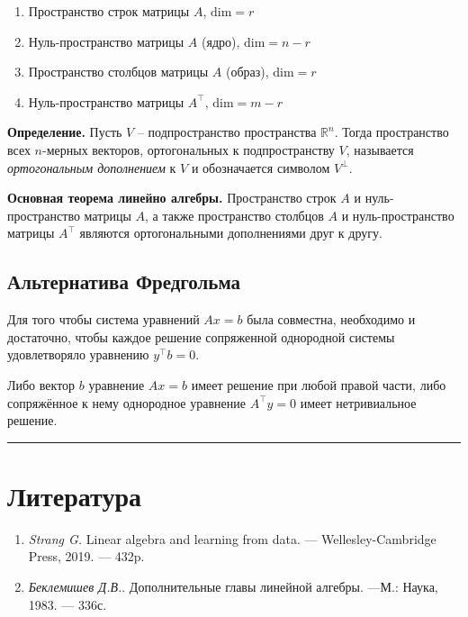 \documentclass[11pt,a4paper]{article}
\renewcommand{\linethickness}{0.1ex}
\providecommand{\tightlist}{%
      \setlength{\itemsep}{0pt}\setlength{\parskip}{0pt}}
\begin{document}
\begin{enumerate}
\def\labelenumi{\arabic{enumi}.}
\tightlist
\item
  Пространство строк матрицы \(A\), \(\mathrm{dim} = r\)
\item
  Нуль-пространство матрицы \(A\) (ядро), \(\mathrm{dim} = n-r\)
\item
  Пространство столбцов матрицы \(A\) (образ), \(\mathrm{dim} = r\)
\item
  Нуль-пространство матрицы \(A^\top\), \(\mathrm{dim} = m-r\)
\end{enumerate}

    \textbf{Определение.} Пусть \(V\) -- подпространство пространства
\(\mathbb{R}^n\). Тогда пространство всех \(n\)-мерных векторов,
ортогональных к подпространству \(V\), называется \emph{ортогональным
дополнением} к \(V\) и обозначается символом \(V^\perp\).

\textbf{Основная теорема линейно алгебры.} Пространство строк \(A\) и
нуль-пространство матрицы \(A\), а также пространство столбцов \(A\) и
нуль-пространство матрицы \(A^\top\) являются ортогональными
дополнениями друг к другу.

    \hypertarget{ux430ux43bux44cux442ux435ux440ux43dux430ux442ux438ux432ux430-ux444ux440ux435ux434ux433ux43eux43bux44cux43cux430}{%
\subsection{Альтернатива
Фредгольма}\label{ux430ux43bux44cux442ux435ux440ux43dux430ux442ux438ux432ux430-ux444ux440ux435ux434ux433ux43eux43bux44cux43cux430}}

Для того чтобы система уравнений \(Ax=b\) была совместна, необходимо и
достаточно, чтобы каждое решение сопряженной однородной системы
удовлетворяло уравнению \(y^\top b = 0\).

Либо вектор \(b\) уравнение \(Ax=b\) имеет решение при любой правой
части, либо сопряжённое к нему однородное уравнение \(A^\top y = 0\)
имеет нетривиальное решение.

    \begin{center}\rule{0.5\linewidth}{\linethickness}\end{center}

    \hypertarget{ux43bux438ux442ux435ux440ux430ux442ux443ux440ux430}{%
\section{Литература}\label{ux43bux438ux442ux435ux440ux430ux442ux443ux440ux430}}

\begin{enumerate}
\def\labelenumi{\arabic{enumi}.}
\tightlist
\item
  \emph{Strang G.} Linear algebra and learning from data. --- Wellesley-Cambridge Press, 2019. --- 432\:p.
\item
  \emph{Беклемишев Д.В.}. Дополнительные главы линейной алгебры. ---М.: Наука, 1983. --- 336\:с.
\end{enumerate}


    
    
    
\end{document}
